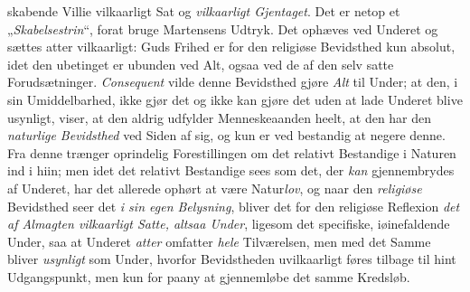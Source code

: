 \documentclass[12pt,a4paper]{book}
\newcommand{\opage}[1]{\marginnote{\footnotesize\textit{[#1]}}}
\begin{document}
skabende Villie vilkaarligt Sat og \emph{vilkaarligt Gjentaget}. Det er netop et
„\emph{Skabelsestrin}“, forat bruge Martensens Udtryk. Det ophæves ved Underet og sættes atter
vilkaarligt: Guds Frihed er for den religiøse Bevidsthed kun absolut, idet den ubetinget
er ubunden ved Alt, ogsaa ved de af den selv satte Forudsætninger. \emph{Consequent} vilde denne
Bevidsthed gjøre \emph{Alt} til Under; at den, i sin Umiddelbarhed, ikke gjør det og ikke kan
gjøre det uden at lade Underet blive usynligt, viser, at den aldrig udfylder
Menneskeaanden heelt, at den har den \emph{naturlige Bevidsthed} ved Siden af sig, og kun er ved
bestandig at negere denne.
Fra denne trænger oprindelig Forestillingen om det relativt Bestandige i Naturen ind i
hiin; men idet det relativt Bestandige sees som det, der \emph{kan} gjennembrydes af Underet,
har det allerede ophørt at være Natur\emph{lov}, og naar den \opage{82}\emph{religiøse} Bevidsthed seer det \emph{i sin egen Belysning}, bliver det for den religiøse Reflexion \emph{det af Almagten vilkaarligt Satte, altsaa Under}, ligesom det specifiske, iøinefaldende Under, saa at Underet \emph{atter} omfatter \emph{hele} Tilværelsen, men med det Samme bliver \emph{usynligt} som Under, hvorfor Bevidstheden
uvilkaarligt føres tilbage til hint Udgangspunkt, men kun for paany at gjennemløbe det
samme Kredsløb.
\end{document}
